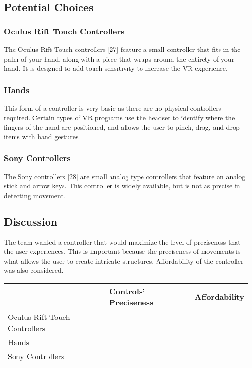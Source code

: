\documentclass[letterpaper,10pt,onecolumn,compsoc]{IEEEtran}
\begin{document}
\subsection{Potential Choices}

\subsubsection{Oculus Rift Touch Controllers}
The Oculus Rift Touch controllers [27] feature a small controller that fits in the palm of your hand, along with a piece that wraps around the entirety of your hand. It is designed to add touch sensitivity to increase the VR experience.

\subsubsection{Hands}
This form of a controller is very basic as there are no physical controllers required. Certain types of VR programs use the headset to identify where the fingers of the hand are positioned, and allows the user to pinch, drag, and drop items with hand gestures.

\subsubsection{Sony Controllers}
The Sony controllers [28] are small analog type controllers that feature an analog stick and arrow keys. This controller is widely available, but is not as precise in detecting movement.

\subsection{Discussion}
The team wanted a controller that would maximize the level of preciseness that the user experiences. This is important because the preciseness of movements is what allows the user to create intricate structures. Affordability of the controller was also considered.


\begin{center}
\begin{tabular}{ | P{4.5cm} | P{3.5cm} | P{2.5cm} | } 
 	\hline
 	 & Controls' Preciseness & Affordability \\ 
 	\hline
 	Oculus Rift Touch Controllers & \checkmark & \checkmark \\ 
 	\hline
 	Hands & \checkmark & \checkmark \\ 
 	\hline
 	Sony Controllers &  & \checkmark \\ 
 	\hline
\end{tabular}
\end{center}
\end{document}
